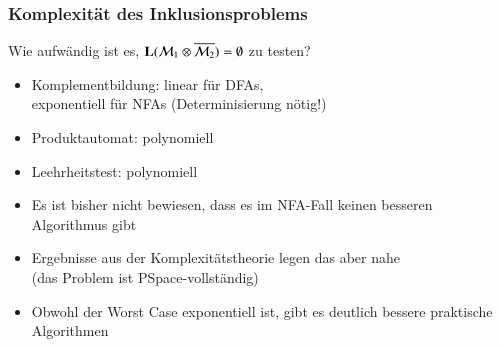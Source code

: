 \documentclass[onlymath]{beamer}
\begin{document}
\begin{frame}\frametitle{Komplexität des Inklusionsproblems}

Wie aufwändig ist es, $\textbf{\textcolor{black}{L}}(\mathcal{M}_1\otimes\overline{\mathcal{M}_2})=\emptyset$ zu testen?%
\begin{itemize}
\item Komplementbildung: linear für DFAs,\\exponentiell für NFAs (Determinisierung nötig!)
\item Produktautomat: polynomiell
\item Leehrheitstest: polynomiell
\end{itemize}\pause

% 
% 
% 

\begin{itemize}
\item Es ist bisher nicht bewiesen, dass es im NFA-Fall keinen besseren Algorithmus gibt
\item Ergebnisse aus der Komplexitätstheorie legen das aber nahe\\[-1ex]
{\tiny \textcolor{devilscss}{(das Problem ist PSpace-vollständig)}}
\item Obwohl der Worst Case exponentiell ist, gibt es deutlich bessere praktische Algorithmen
\end{itemize}

\end{frame}
\end{document}
